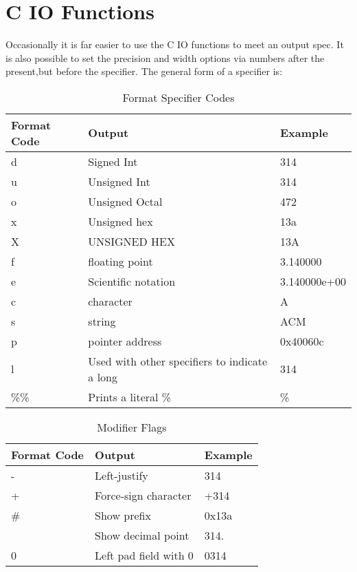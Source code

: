 \section{C IO Functions}
Occasionally it is far easier to use the C IO functions to meet an output spec. It is also possible to set the precision and width options via numbers after the present,but before the specifier.  The general form of a specifier is: 

\begin{code}
\end{code}

\begin{table}[h]
    \caption{Format Specifier Codes \cite{cplusplus}}
    \begin{tabularx}{\textwidth}{|l|X|l|} \hline
        Format Code &   Output              &   Example     \\ \hline
        d           &   Signed Int          &   314         \\
        u           &   Unsigned Int        &   314         \\
        o           &   Unsigned Octal      &   472         \\
        x           &   Unsigned hex        &   13a         \\
        X           &   UNSIGNED HEX        &   13A         \\
        f           &   floating point      &   3.140000    \\
        e           &   Scientific notation &   3.140000e+00\\
        c           &   character           &   A           \\
        s           &   string              &   ACM         \\
        p           &   pointer address     &   0x40060c    \\
        l           &   Used with other specifiers to indicate a long & 314 \\
        \%\%        &   Prints a literal \% &   \%          \\
        \hline
    \end{tabularx}
\end{table}

\begin{table}[h]
    \caption{Modifier Flags \cite{cplusplus}}
    \begin{tabularx}{\textwidth}{|l|X|l|} \hline
        Format Code &   Output                  &   Example    \\ \hline
        -           &   Left-justify            &   314        \\
        +           &   Force-sign character    &   +314       \\
        \#          &   Show prefix             &   0x13a      \\
                    &   Show decimal point      &   314.       \\
        0           &   Left pad field with 0   &   0314       \\
        \hline
    \end{tabularx}
\end{table}

